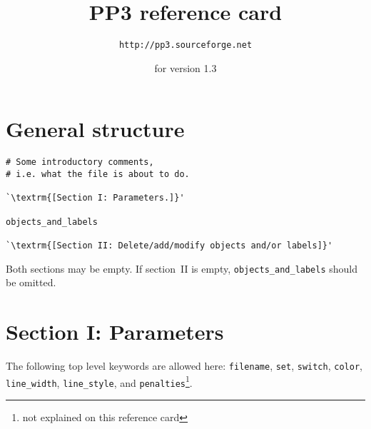 \documentclass{article}
\newcommand{\PPthree}{\textsf{PP3}\xspace}
\newcommand{\subskip}{\bigskip\medskip}
\begin{document}
\raggedright\small\setlength{\columnsep}{2cm}
\pagestyle{empty}

\begin{multicols*}{3}
\title{\PPthree reference card}
\author{\texttt{http://pp3.sourceforge.net}}
\date{for version 1.3}
  \maketitle\thispagestyle{empty}





\section{General structure}

\begin{lstlisting}
# Some introductory comments,
# i.e. what the file is about to do.

`\textrm{[Section I: Parameters.]}'

objects_and_labels

`\textrm{[Section II: Delete/add/modify objects and/or labels]}'
\end{lstlisting}
Both sections may be empty.  If section~II is empty,
\lstinline{objects_and_labels} should be omitted.

\section{Section I: Parameters}

The following top level keywords are allowed here: \lstinline{filename},
\lstinline{set}, \lstinline{switch}, \lstinline{color}, \lstinline{line_width},
\lstinline{line_style}, and \lstinline{penalties}\footnote{not explained on
  this reference card}.\subskip


\end{multicols*}
\end{document}
